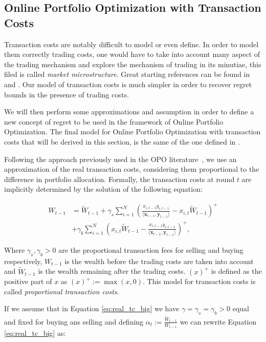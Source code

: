 \subsection{Online Portfolio Optimization with Transaction Costs}

Transaction costs are notably difficult to model or even define. In order to model them correctly trading costs, one would have to take into account many aspect of the trading mechanism and explore the mechanism of trading in its minutiae, this filed is called \emph{market microstructure}. Great starting references can be found in \cite{harris2003trading} and \cite{o1997market}. Our model of transaction costs is much simpler in order to recover regret bounds in the presence of trading costs.

We will then perform some approximations and assumption in order to define a new concept of regret to be used in the framework of Online Portfolio Optimization. The final model for Online Portfolio Optimization with transaction costs that will be derived in this section, is the same of the one defined in \cite{das2013online}.

Following the approach previously used in the OPO literature~\cite{blum1999universal}, we use an approximation of the real transaction costs, considering them proportional to the difference in portfolio allocation.
Formally, the transaction costs at round $t$ are implicitly determined by the solution of the following equation:

\begin{align}\label{eq:real_tc_big}
W_{t-1}&=\tilde W_{t-1}+\gamma_s\sum\limits_{i=1}^N\left(\frac{x_{i,t-1}y_{i,t-1}}{\langle \mathbf x_{t-1},\mathbf y_{t-1}\rangle}-x_{i,t}\tilde W_{t-1}\right)^+\\\nonumber
&+\gamma_b\sum\limits_{i=1}^N\left(x_{i,t}\tilde W_{t-1}-\frac{x_{i,t-1}y_{i,t-1}}{\langle \mathbf x_{t-1},\mathbf y_{t-1}\rangle}\right)^+,
\end{align}

Where $\gamma_s,\gamma_b>0$ are the proportional transaction fees for selling and buying respectively, $W_{t-1}$ is the wealth before the trading costs are taken into account and $\tilde W_{t-1}$ is the wealth remaining after the trading costs. $(x)^+$ is defined as the positive part of $x$ as $(x)^+:=\max(x,0)$.
This model for transaction costs is called \emph{proportional transaction costs}. 

If we assume that in Equation \eqref{eq:real_tc_big} we have $\gamma=\gamma_s=\gamma_b>0$ equal and fixed for buying ans selling and defining $\alpha_t:=\frac{\tilde W_{t-1}}{W_{t-1}}$ we can rewrite Equation \eqref{eq:real_tc_big} as:

